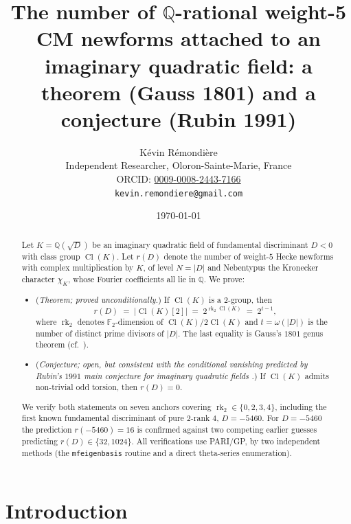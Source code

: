 \documentclass[11pt]{amsart}
\title[Q-rational weight-5 CM newforms]{The number of \(\mathbb{Q}\)-rational
weight-5 CM newforms attached to an imaginary quadratic field:
a theorem (Gauss 1801) and a conjecture (Rubin 1991)}
\author{K\'evin R\'emondi\`ere\\
\small Independent Researcher, Oloron-Sainte-Marie, France\\
\small ORCID: \href{https://orcid.org/0009-0008-2443-7166}{0009-0008-2443-7166}\\
\small \texttt{kevin.remondiere@gmail.com}}
\date{\today}
\theoremstyle{definition}
\theoremstyle{remark}
\DeclareMathOperator{\Cl}{Cl}
\DeclareMathOperator{\rk}{rk}
\newcommand{\Q}{\mathbb{Q}}
\newcommand{\F}{\mathbb{F}}
\newcommand{\chiK}{\chi_K}
\begin{document}
\begin{abstract}
Let \(K = \Q(\sqrt{D})\) be an imaginary quadratic field of fundamental
discriminant \(D < 0\) with class group \(\Cl(K)\). Let \(r(D)\) denote
the number of weight-\(5\) Hecke newforms with complex multiplication
by \(K\), of level \(N = |D|\) and Nebentypus the Kronecker character
\(\chiK\), whose Fourier coefficients all lie in \(\Q\). We prove:
\begin{itemize}
  \item[(\textbf{T})] (\emph{Theorem;
    proved unconditionally.}) If \(\Cl(K)\) is a \(2\)-group, then
    \[
      r(D) \;=\; |\Cl(K)[2]| \;=\; 2^{\rk_2 \Cl(K)} \;=\; 2^{t-1},
    \]
    where \(\rk_2\) denotes \(\F_2\)-dimension of \(\Cl(K)/2\Cl(K)\)
    and \(t = \omega(|D|)\) is the number of distinct prime divisors of
    \(|D|\). The last equality is Gauss's \(1801\) genus theorem
    \cite[\S\S 225--237]{Gauss1801} (cf.\ \cite[Thm.~3.15]{Cox1989}).
  \item[(\textbf{C})] (\emph{Conjecture;
    open, but consistent with the conditional vanishing predicted by
    Rubin's \(1991\) main conjecture for imaginary quadratic fields
    \cite{Rubin1991}.}) If \(\Cl(K)\) admits non-trivial odd torsion,
    then \(r(D) = 0\).
\end{itemize}
We verify both statements on seven anchors covering
\(\rk_2 \in \{0, 2, 3, 4\}\), including the first known fundamental
discriminant of pure \(2\)-rank \(4\), \(D = -5460\). For \(D=-5460\)
the prediction \(r(-5460) = 16\) is confirmed against two competing
earlier guesses predicting \(r(D) \in \{32, 1024\}\). All
verifications use PARI/GP, by two independent methods (the
\texttt{mfeigenbasis} routine and a direct theta-series enumeration).
\end{abstract}

\maketitle

\section{Introduction}\label{sec:intro}
\end{document}
